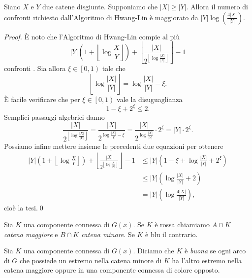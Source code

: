 \begin{lemma}
  \label{hwanglinlemma} Siano \(X\) e \(Y\) due catene disgiunte. Supponiamo che \(|X|\ge|Y|\). Allora il numero di confronti richiesto dall'Algoritmo di Hwang-Lin è maggiorato da \(|Y|\log(\frac{4|X|}{|Y|})\). 
\end{lemma}
\begin{proof}
  È noto che l'Algoritmo di Hwang-Lin compie al più
  \[|Y|\left(1+\left\lfloor{\log{\frac{X}{Y}}}\right\rfloor\right)+\left\lfloor\frac{|X|}{2^{\left\lfloor\log{\frac{|X|}{|Y|}}\right\rfloor}}\right\rfloor-1\]
  confronti \cite{Hwang1972}. Sia allora \(\xi\in\left[0,1\right)\) tale che
    \[\left\lfloor\log{\frac{|X|}{|Y|}}\right\rfloor=\log{\frac{|X|}{|Y|}}-\xi.\]
    È facile verificare che per \(\xi\in\left[0,1\right)\) vale la disuguaglianza
      \[1-\xi+2^{\xi}\le 2.\]
      Semplici passaggi algebrici danno
      \[\frac{|X|}{2^{\left\lfloor\log{\frac{|X|}{|Y|}}\right\rfloor}}=\frac{|X|}{2^{\log{\frac{|X|}{|Y|}}-\xi}}=\frac{|X|}{2^{\log{\frac{|X|}{|Y|}}}}\cdot 2^{\xi}=|Y|\cdot 2^{\xi}.\]
      Possiamo infine mettere insieme le precedenti due equazioni per ottenere 
      \begin{align}
	|Y|\left(1+\left\lfloor{\log{\frac{X}{Y}}}\right\rfloor\right)+\left\lfloor\frac{|X|}{2^{\left\lfloor\log{\frac{|X|}{|Y|}}\right\rfloor}}\right\rfloor-1&\le|Y|\left(1-\xi+\log{\frac{|X|}{|Y|}}+2^{\xi}\right) \nonumber \\
	&\le |Y|\left(\log{\frac{|X|}{|Y|}}+2\right) \nonumber \\
	&= |Y|\left(\log{\frac{4|X|}{|Y|}}\right), \nonumber 
      \end{align}
      cioè la tesi.\qed 
\end{proof}
\begin{definition}
  Sia \(K\) una componente connessa di \(G(x)\). Se \(K\) è rossa chiamiamo \(A\cap K\) \emph{catena maggiore} e \(B\cap K\) \emph{catena minore}. Se \(K\) è blu il contrario. 
\end{definition}
\begin{definition}
  Sia \(K\) una componente connessa di \(G(x)\). Diciamo che \(K\) è \emph{buona} se ogni arco di \(G\) che possiede un estremo nella catena minore di \(K\) ha l'altro estremo nella catena maggiore oppure in una componente connessa di colore opposto. 
\end{definition}
